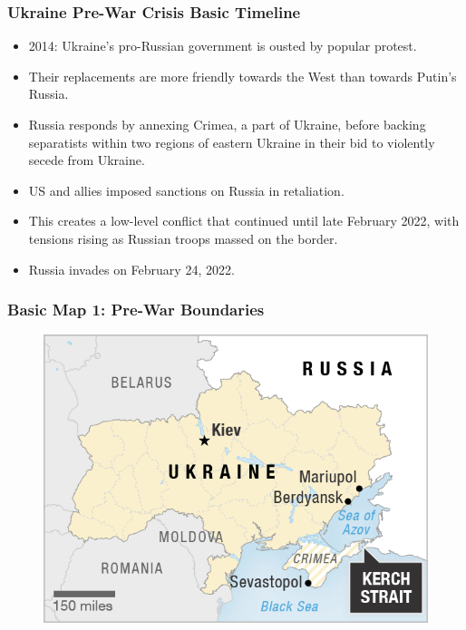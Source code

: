 \documentclass{beamer}
\begin{document}
\begin{frame} 
	\frametitle{\LARGE{Ukraine Pre-War Crisis Basic Timeline}}
	\begin{itemize}
		\item 2014: Ukraine's pro-Russian government is ousted by popular protest. \pause
		\item Their replacements are more friendly towards the West than towards Putin's Russia. \pause
		\item Russia responds by annexing Crimea, a part of Ukraine, before backing separatists within two regions of eastern Ukraine in their bid to violently secede from Ukraine. \pause
		\item US and allies imposed sanctions on Russia in retaliation.
		\item This creates a low-level conflict that continued until late February 2022, with tensions rising as Russian troops massed on the border.	
		\item Russia invades on February 24, 2022.
	\end{itemize}
\end{frame}

\begin{frame} 
	\frametitle{\LARGE{Basic Map 1: Pre-War Boundaries}}
	\begin{figure}[ht!]
		\centering
		\includegraphics[width=\textwidth,height=0.9\textheight,keepaspectratio]{map1.png}
	\end{figure}
\end{frame}
\end{document}
